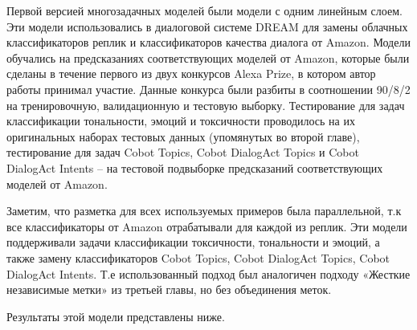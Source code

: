 Первой версией многозадачных моделей были модели с одним линейным слоем. Эти модели использовались в диалоговой системе DREAM для замены облачных классификаторов реплик и классификаторов качества диалога от Amazon. Модели обучались на предсказаниях соответствующих моделей от Amazon, которые были сделаны в течение первого из двух конкурсов Alexa Prize, в котором автор работы принимал участие. Данные конкурса были разбиты в соотношении 90/8/2 на тренировочную, валидационную и тестовую выборку. Тестирование для задач классификации тональности, эмоций и токсичности проводилось на их оригинальных наборах тестовых данных (упомянутых во второй главе), тестирование для задач Cobot Topics, Cobot DialogAct Topics и Cobot DialogAct Intents -- на тестовой подвыборке предсказаний соответствующих моделей от Amazon.

Заметим, что разметка для всех используемых примеров была параллельной, т.к все классификаторы от Amazon отрабатывали для каждой из реплик. Эти модели поддерживали задачи классификации токсичности, тональности и эмоций, а также замену классификаторов Cobot Topics, Cobot DialogAct Topics, Cobot DialogAct Intents. Т.е использованный подход был аналогичен подходу «Жесткие независимые метки» из третьей главы, но без объединения меток. 

Результаты этой модели представлены ниже.

\begin{table}[htbp]
    \caption{Точность (взвешенный-F1) для многозадачной классификации для различных моделей. «1 в 1» означает оригинальные модели, «6 в 1» -- многозадачную модель с одним линейным слоем, обученную на аннотациях всех упомянутых в таблице классификаторов, «3 в 1 (cobot)» -- многозадачную модель с одним линейным слоем, обученную только на аннотациях классификаторов cobot topics, cobot dialogact topics и cobot dialogact intents, «3 в 1 (не cobot)» -- многозадачную модель с одним линейным слоем, обученную только на аннотациях остальных классификаторов(классификаторы эмоций, тональности и токсичности).}
    \label{mtldream:1}
    \centering
\end{table}

